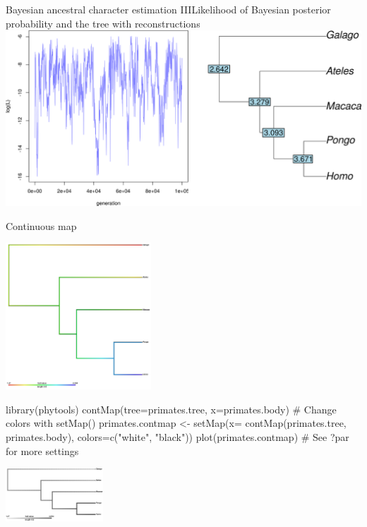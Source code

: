 \documentclass[compress, ucs, xelatex, 11pt, xcolor=svgnames,
  hyperref={
    bookmarks=true,
    unicode=true,
    colorlinks=true,
    pdftitle={Molecular data in R},
    plainpages=false,
    pdfauthor={Vojtech Zeisek},
    pdfsubject={Course about phylogeny and evolution in R},
    pdfcreator={XeLaTeX},
    pdfkeywords={R, evolution, phylogeny, molecular data},
    linkcolor=Tomato,
    anchorcolor=SaddleBrown,
    citecolor=Goldenrod,
    filecolor=DarkMagenta,
    menucolor=Sienna,
    urlcolor=DarkTurquoise,
    pdftex},
  url={hyphens, lowtilde} %
  ]{beamer}
\begin{document}
\begin{frame}{Bayesian ancestral character estimation III}{Likelihood of Bayesian posterior probability and the tree with reconstructions}
  \includegraphics[width=\textwidth]{ancbayes.png}
\end{frame}

\begin{frame}[fragile]{Continuous map}
\begin{multicols}{2}
  \vfill
  \begin{center}
    \includegraphics[height=5.5cm]{contmap.png}
  \end{center}
  \vfill
  \begin{spluscode}
    library(phytools)
    contMap(tree=primates.tree,
      x=primates.body)
    # Change colors with setMap()
    primates.contmap <- setMap(x=
      contMap(primates.tree,
      primates.body),
      colors=c("white", "black"))
    plot(primates.contmap)
    # See ?par for more settings
  \end{spluscode}
  \vfill
  \begin{center}
    \includegraphics[height=2cm]{contmapbw.png}
  \end{center}
  \vfill
\end{multicols}
\end{frame}
\end{document}
